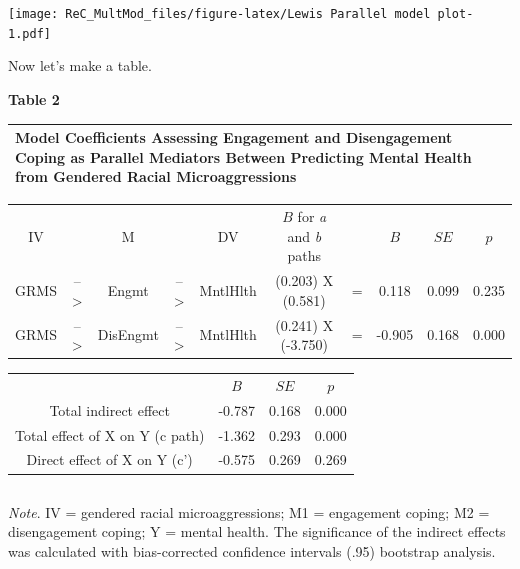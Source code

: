 \documentclass[
  english,
]{book}
\begin{document}
\texttt{[image: ReC\_MultMod\_files/figure-latex/Lewis Parallel model plot-1.pdf]}

Now let's make a table.

\textbf{Table 2 }

\begin{longtable}[]{@{}
  >{\raggedright\arraybackslash}p{}@{}}
\toprule
Model Coefficients Assessing Engagement and Disengagement Coping as Parallel Mediators Between Predicting Mental Health from Gendered Racial Microaggressions \\
\midrule
\endhead
\bottomrule
\end{longtable}

\begin{longtable}[]{@{}cccccccccc@{}}
\toprule
& & & & & & & & & \\
\midrule
\endhead
IV & & M & & DV & \(B\) for \emph{a} and \emph{b} paths & & \(B\) & \(SE\) & \(p\) \\
GRMS & --\textgreater{} & Engmt & --\textgreater{} & MntlHlth & (0.203) X (0.581) & = & 0.118 & 0.099 & 0.235 \\
GRMS & --\textgreater{} & DisEngmt & --\textgreater{} & MntlHlth & (0.241) X (-3.750) & = & -0.905 & 0.168 & 0.000 \\
\bottomrule
\end{longtable}

\begin{longtable}[]{@{}cccc@{}}
\toprule
& & & \\
\midrule
\endhead
& \(B\) & \(SE\) & \(p\) \\
Total indirect effect & -0.787 & 0.168 & 0.000 \\
Total effect of X on Y (c path) & -1.362 & 0.293 & 0.000 \\
Direct effect of X on Y (c') & -0.575 & 0.269 & 0.269 \\
\bottomrule
\end{longtable}

\begin{longtable}[]{@{}l@{}}
\toprule
 \\
\midrule
\endhead
\bottomrule
\end{longtable}

\emph{Note}. IV = gendered racial microaggressions; M1 = engagement coping; M2 = disengagement coping; Y = mental health. The significance of the indirect effects was calculated with bias-corrected confidence intervals (.95) bootstrap analysis.
\end{document}
